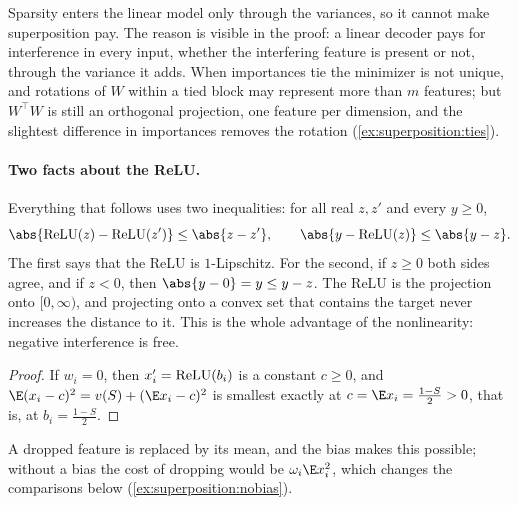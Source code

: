 \begin{refsection}
Sparsity enters the linear model only through the variances, so it cannot make superposition pay. The reason is visible in the proof: a linear decoder pays for interference in every input, whether the interfering feature is present or not, through the variance it adds. When importances tie the minimizer is not unique, and rotations of $W$ within a tied block may represent more than $m$ features; but $W^\top W$ is still an orthogonal projection, one feature per dimension, and the slightest difference in importances removes the rotation (\cref{ex:superposition:ties}).

\paragraph{Two facts about the ReLU.} Everything that follows uses two inequalities: for all real $z,z'$ and every $y\ge0$,
\begin{equation}\label{eq:superposition:relu}
  \abs{\relu(z)-\relu(z')}\le\abs{z-z'},\qquad\abs{y-\relu(z)}\le\abs{y-z}.
\end{equation}
The first says that the ReLU is $1$-Lipschitz. For the second, if $z\ge0$ both sides agree, and if $z<0$, then $\abs{y-0}=y\le y-z$. The ReLU is the projection onto $[0,\infty)$, and projecting onto a convex set that contains the target never increases the distance to it. This is the whole advantage of the nonlinearity: negative interference is free.


\begin{proof}
If $w_i=0$, then $x'_i=\operatorname{ReLU}(b_i)$ is a constant $c\ge0$, and $\E(x_i-c)^2=\supv+(\E x_i-c)^2$ is smallest exactly at $c=\E x_i=\frac{1-S}2>0$, that is, at $b_i=\frac{1-S}2$.
\end{proof}

A dropped feature is replaced by its mean, and the bias makes this possible; without a bias the cost of dropping would be $\omega_i\E x_i^2$, which changes the comparisons below (\cref{ex:superposition:nobias}).


\end{refsection}
